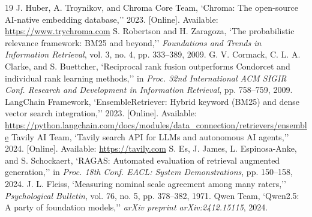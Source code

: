 \documentclass[conference]{IEEEtran}
\begin{document}
\begin{thebibliography}{19}
 J. Huber, A. Troynikov, and Chroma Core Team, `Chroma: The open-source AI-native embedding database,'' 2023. [Online]. Available: \url{https://www.trychroma.com}
 S. Robertson and H. Zaragoza, `The probabilistic relevance framework: BM25 and beyond,'' \textit{Foundations and Trends in Information Retrieval}, vol. 3, no. 4, pp. 333--389, 2009.
 G. V. Cormack, C. L. A. Clarke, and S. Buettcher, `Reciprocal rank fusion outperforms Condorcet and individual rank learning methods,'' in \textit{Proc. 32nd International ACM SIGIR Conf. Research and Development in Information Retrieval}, pp. 758--759, 2009.
 LangChain Framework, `EnsembleRetriever: Hybrid keyword (BM25) and dense vector search integration,'' 2023. [Online]. Available: \url{https://python.langchain.com/docs/modules/data_connection/retrievers/ensemble}
 Tavily AI Team, `Tavily search API for LLMs and autonomous AI agents,'' 2024. [Online]. Available: \url{https://tavily.com}
 S. Es, J. James, L. Espinosa-Anke, and S. Schockaert, `RAGAS: Automated evaluation of retrieval augmented generation,'' in \textit{Proc. 18th Conf. EACL: System Demonstrations}, pp. 150--158, 2024.
 J. L. Fleiss, `Measuring nominal scale agreement among many raters,'' \textit{Psychological Bulletin}, vol. 76, no. 5, pp. 378--382, 1971.
 Qwen Team, `Qwen2.5: A party of foundation models,'' \textit{arXiv preprint arXiv:2412.15115}, 2024.
\end{thebibliography}
\end{document}
